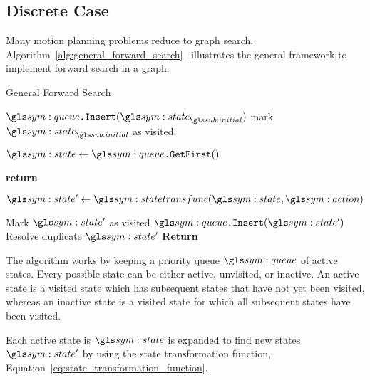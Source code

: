 
	\subsection{Discrete Case}%
	\label{sec:discrete_case}

		Many motion planning problems reduce to graph search.
		Algorithm~\ref{alg:general_forward_search}~\cite[adapted
		from][]{bib:planning:planning_algorithms} illustrates the general
		framework to implement forward search in a graph.

		\begin{algorithm}[ht]
			\caption{General Forward Search}\label{alg:general_forward_search}
			\begin{algorithmic}[1]

					\State{} $\queue\code{.Insert}(\state_{\initial})$
					\State{} mark $\state_{\initial}$ as visited.

					\While{$\queue \neq \emptyset$}

						\State{} $\state \gets \queue\code{.GetFirst}()$
						\If{$\state \in \statespace_{\goal}$}

							\State{} \textbf{return} 

						\EndIf{}

						\ForAll{$\action \in \actionspace(\state)$}
							\State{} $\state' \gets \statetransfunc(\state, \action)$

								\State{} Mark $\state'$ as visited
								\State{} $\queue\code{.Insert}(\state')$
							\Else{}
								\State{} Resolve duplicate $\state'$
							\EndIf{}
						\EndFor{}
					\EndWhile{}
					\State{} \textbf{Return} 
				\EndProcedure{}
			\end{algorithmic}
		\end{algorithm}

		The algorithm works by keeping a priority queue $\queue$ of active
		states. Every possible state can be either active, unvisited, or
		inactive. An active state is a visited state which has subsequent states
		that have not yet been visited, whereas an inactive state is a visited
		state for which all subsequent states have been visited.

		Each active state is $\state$ is expanded to find new states $\state'$
		by using the state transformation function,
		Equation~\ref{eq:state_transformation_function}.

